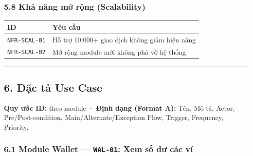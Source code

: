 \documentclass[11pt,a4paper]{article}
\newcounter{none}
\begin{document}
\subsubsection{5.8 Khả năng mở rộng (Scalability)}\label{khux1ea3-nux103ng-mux1edf-rux1ed9ng-scalability}

{\def\LTcaptype{none}
\begin{longtable}[]{@{}
  >{\raggedright\arraybackslash}p{}
  >{\raggedright\arraybackslash}p{}@{}}
\toprule\noalign{}
ID & Yêu cầu \\
\midrule\noalign{}
\endhead
\bottomrule\noalign{}
\endlastfoot
\texttt{NFR-SCAL-01} & Hỗ trợ 10.000+ giao dịch không giảm hiệu năng \\ 
\texttt{NFR-SCAL-02} & Mở rộng module mới không phá vỡ hệ thống \\
\end{longtable}
}

\begin{center}\rule{1.0\linewidth}{0.5pt}\end{center}

\newpage

\subsection{6. Đặc tả Use Case}\label{ux111ux1eb7c-tux1ea3-use-case}

\textbf{Quy ước ID:} theo module · \textbf{Định dạng (Format A):} Tên,
Mô tả, Actor, Pre/Post-condition, Main/Alternate/Exception Flow,
Trigger, Frequency, Priority.

\subsubsection{\texorpdfstring{6.1 Module Wallet --- \texttt{WAL-01}: Xem số dư các ví}{6.1 Module Wallet --- WAL-01: Xem số dư các ví}}\label{module-wallet-wal-01-xem-sux1ed1-dux1b0-cuxe1c-vuxed}
\end{document}
